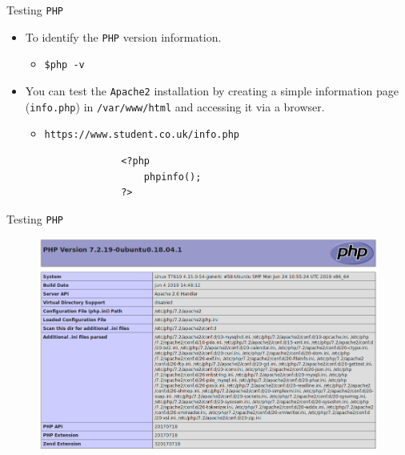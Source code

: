 \documentclass[xcolor=table]{beamer}
\begin{document}
\begin{frame}[fragile]{Testing \texttt{PHP}}
  \begin{itemize}
     \item To identify the \texttt{PHP} version information.
       \begin{itemize}
         \item \texttt{\$php -v}
       \end{itemize}
    \item You can test the \texttt{Apache2} installation by creating a simple information page (\texttt{info.php}) in \texttt{/var/www/html} and accessing it via a browser.
      \begin{itemize}
        \item \texttt{https://www.student.co.uk/info.php}
      \end{itemize}
  \end{itemize}
  \begin{tcolorbox}
    \lstset{
      basicstyle=\scriptsize\ttfamily,
    }
\begin{lstlisting}
                    <?php 
                        phpinfo(); 
                    ?>
\end{lstlisting}
  \end{tcolorbox}
\end{frame}

\begin{frame}{Testing \texttt{PHP}}
  \begin{figure}
    \begin{center}
      \includegraphics[width=1\linewidth]{phpinfo.png}
    \end{center}
  \end{figure}
\end{frame}
\end{document}
